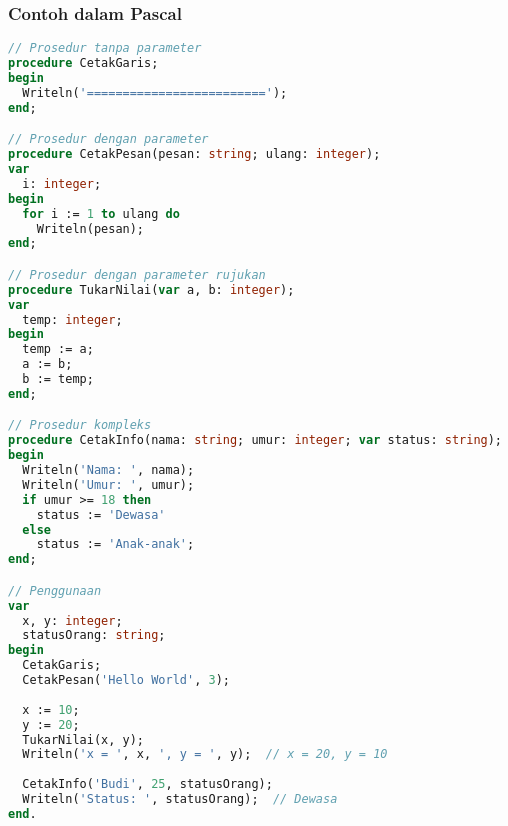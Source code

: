 \documentclass[../main.tex]{subfiles}
\begin{document}
\subsubsection{Contoh dalam Pascal}
\begin{lstlisting}[language=Pascal, caption={Deklarasi dan definisi prosedur (Pascal)}]
// Prosedur tanpa parameter
procedure CetakGaris;
begin
  Writeln('=========================');
end;

// Prosedur dengan parameter
procedure CetakPesan(pesan: string; ulang: integer);
var
  i: integer;
begin
  for i := 1 to ulang do
    Writeln(pesan);
end;

// Prosedur dengan parameter rujukan
procedure TukarNilai(var a, b: integer);
var
  temp: integer;
begin
  temp := a;
  a := b;
  b := temp;
end;

// Prosedur kompleks
procedure CetakInfo(nama: string; umur: integer; var status: string);
begin
  Writeln('Nama: ', nama);
  Writeln('Umur: ', umur);
  if umur >= 18 then
    status := 'Dewasa'
  else
    status := 'Anak-anak';
end;

// Penggunaan
var
  x, y: integer;
  statusOrang: string;
begin
  CetakGaris;
  CetakPesan('Hello World', 3);
  
  x := 10;
  y := 20;
  TukarNilai(x, y);
  Writeln('x = ', x, ', y = ', y);  // x = 20, y = 10
  
  CetakInfo('Budi', 25, statusOrang);
  Writeln('Status: ', statusOrang);  // Dewasa
end.
\end{lstlisting}
\end{document}
